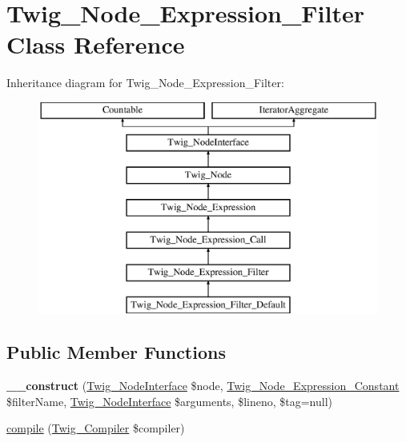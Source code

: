 \hypertarget{class_twig___node___expression___filter}{}\section{Twig\+\_\+\+Node\+\_\+\+Expression\+\_\+\+Filter Class Reference}
\label{class_twig___node___expression___filter}
Inheritance diagram for Twig\+\_\+\+Node\+\_\+\+Expression\+\_\+\+Filter\+:\begin{figure}[H]
\begin{center}
\leavevmode
\includegraphics[height=7.000000cm]{class_twig___node___expression___filter}
\end{center}
\end{figure}
\subsection*{Public Member Functions}
\begin{DoxyCompactItemize}
\item 
\hypertarget{class_twig___node___expression___filter_a71feda7cd9ef9a14a271f02222d6c9b6}{}{\bfseries \+\_\+\+\_\+construct} (\hyperlink{interface_twig___node_interface}{Twig\+\_\+\+Node\+Interface} \$node, \hyperlink{class_twig___node___expression___constant}{Twig\+\_\+\+Node\+\_\+\+Expression\+\_\+\+Constant} \$filter\+Name, \hyperlink{interface_twig___node_interface}{Twig\+\_\+\+Node\+Interface} \$arguments, \$lineno, \$tag=null)\label{class_twig___node___expression___filter_a71feda7cd9ef9a14a271f02222d6c9b6}

\item 
\hyperlink{class_twig___node___expression___filter_a4e0faa87c3fae583620b84d3607085da}{compile} (\hyperlink{class_twig___compiler}{Twig\+\_\+\+Compiler} \$compiler)
\end{DoxyCompactItemize}
